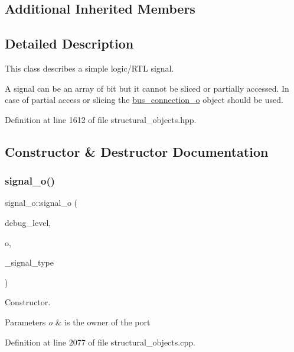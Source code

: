 \subsection*{Additional Inherited Members}


\subsection{Detailed Description}
This class describes a simple logic/\+R\+TL signal. 

A signal can be an array of bit but it cannot be sliced or partially accessed. In case of partial access or slicing the \hyperlink{classbus__connection__o}{bus\+\_\+connection\+\_\+o} object should be used. 

Definition at line 1612 of file structural\+\_\+objects.\+hpp.



\subsection{Constructor \& Destructor Documentation}
\mbox{\label{classsignal__o_a3c1e51b33b28b50c084945f21878e104}} 
\subsubsection{\texorpdfstring{signal\+\_\+o()}{signal\_o()}}
{\footnotesize\ttfamily signal\+\_\+o\+::signal\+\_\+o (\begin{DoxyParamCaption}\item[{int}]{debug\+\_\+level,  }\item[{const \hyperlink{structural__objects_8hpp_a8ea5f8cc50ab8f4c31e2751074ff60b2}{structural\+\_\+object\+Ref}}]{o,  }\item[{\hyperlink{structural__objects_8hpp_acf52399aecacb7952e414c5746ce6439}{so\+\_\+kind}}]{\+\_\+signal\+\_\+type }\end{DoxyParamCaption})}



Constructor. 


\begin{DoxyParams}{Parameters}
{\em o} & is the owner of the port \\
\hline
\end{DoxyParams}


Definition at line 2077 of file structural\+\_\+objects.\+cpp.



